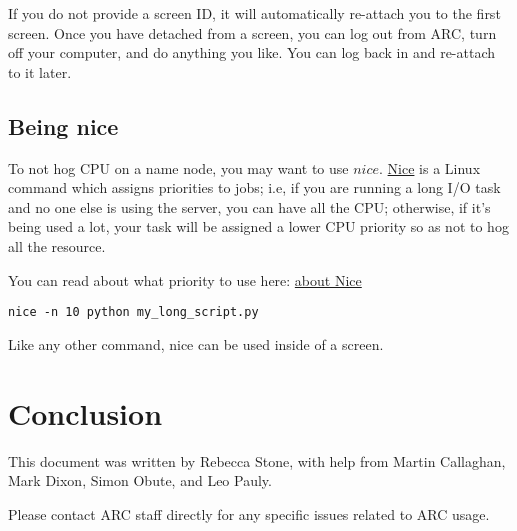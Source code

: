 \documentclass[]{article}
\begin{document}
If you do not provide a screen ID, it will automatically re-attach you to the first screen. Once you have detached from a screen, you can log out from ARC, turn off your computer, and do anything you like. You can log back in and re-attach to it later.

\subsection{Being nice}

To not hog CPU on a name node, you may want to use \(nice\). \href{https://en.wikipedia.org/wiki/Nice_(Unix)}{Nice} is a Linux command which assigns priorities to jobs; i.e, if you are running a long I/O task and no one else is using the server, you can have all the CPU; otherwise, if it's being used a lot, your task will be assigned a lower CPU priority so as not to hog all the resource.

You can read about what priority to use here: \href{https://en.wikipedia.org/wiki/Nice_(Unix)}{about Nice}

\begin{lstlisting}
nice -n 10 python my_long_script.py
\end{lstlisting}

Like any other command, nice can be used inside of a screen.

\section{Conclusion}

This document was written by Rebecca Stone, with help from Martin Callaghan, Mark Dixon, Simon Obute, and Leo Pauly.

Please contact ARC staff directly for any specific issues related to ARC usage.
\end{document}
